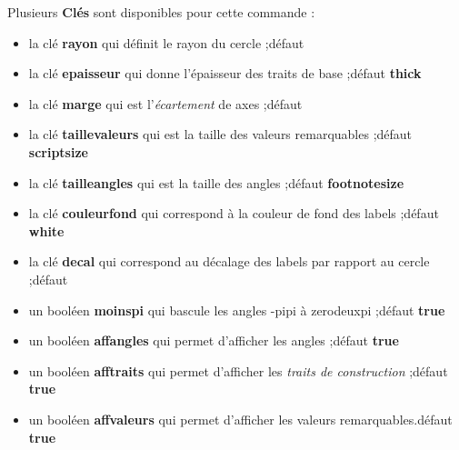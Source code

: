 \documentclass{article}
\newcommand\Cle[1]{{\bfseries\sffamily\textlangle #1\textrangle}}
\begin{document}
\begin{codecles}
Plusieurs \Cle{Clés} sont disponibles pour cette commande :

\begin{itemize}
	\item la clé \Cle{rayon} qui définit le rayon du cercle ;\hfill{}défaut \Cle{3}
	\item la clé \Cle{epaisseur} qui donne l'épaisseur des traits de base ;\hfill{}défaut \Cle{thick}
	\item la clé \Cle{marge} qui est l'\textit{écartement} de axes  ;\hfill{}défaut \Cle{0.25}
	\item la clé \Cle{taillevaleurs} qui est la taille des valeurs remarquables ;\hfill{}défaut \Cle{scriptsize}
	\item la clé \Cle{tailleangles} qui est la taille des angles ;\hfill{}défaut \Cle{footnotesize}
	\item la clé \Cle{couleurfond} qui correspond à la couleur de fond des labels ;\hfill{}défaut \Cle{white}
	\item la clé \Cle{decal} qui correspond au décalage des labels par rapport au cercle ;\hfill{}défaut \Cle{10pt}
	\item un booléen \Cle{moinspi} qui bascule les angles \og -pipi \fg{} à \og zerodeuxpi \fg{} ;\hfill{}défaut \Cle{true}
	\item un booléen \Cle{affangles} qui permet d'afficher les angles ;\hfill{}défaut \Cle{true}
	\item un booléen \Cle{afftraits} qui permet d'afficher les \textit{traits de construction}  ;\hfill{}défaut \Cle{true}
	\item un booléen \Cle{affvaleurs} qui permet d'afficher les valeurs remarquables.\hfill{}défaut \Cle{true}
\end{itemize}
\end{codecles}

\pagebreak

\begin{codetex}
\begin{center}
	\begin{tikzpicture}[line join=bevel]
		\cercletrigoPL[rayon=2.5,affvaleurs=false,decal=8pt]
	\end{tikzpicture}
	~~~~
	\begin{tikzpicture}[line join=bevel]
		\cercletrigoPL[rayon=2.5,affangles=false]
	\end{tikzpicture}
	~~~~
	\begin{tikzpicture}[line join=bevel]
		\cercletrigoPL[rayon=2.5,moinspi=false,couleurfond=orange!15]
	\end{tikzpicture}
\end{center}
\end{codetex}
\end{document}
